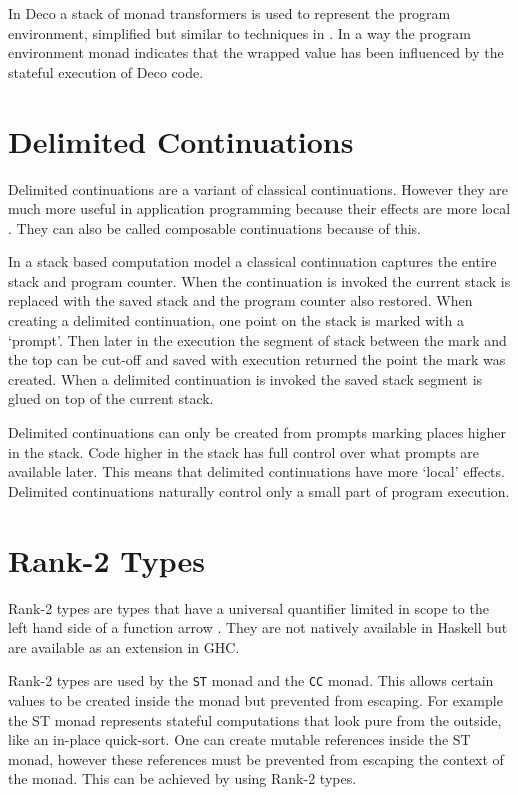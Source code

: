 \documentclass[]{article}
\newcommand{\type}[1]{\texttt{#1}}
\begin{document}
In Deco a stack of monad transformers is used to represent the program
environment, simplified but similar to techniques in \cite{Liang:Unknown1}. In
a way the program environment monad indicates that the wrapped value has been
influenced by the stateful execution of Deco code.

\section{Delimited Continuations}
\label{discussion:delcont}

Delimited continuations are a variant of classical continuations. However they
are much more useful in application programming because their effects are more
local \cite{Oleg:2011}. They can also be called composable continuations
because of this.

In a stack based computation model a classical continuation captures the
entire stack and program counter. When the continuation is invoked the current
stack is replaced with the saved stack and the program counter also restored.
When creating a delimited continuation, one point on the stack is marked with
a `prompt'. Then later in the execution the segment of stack between the mark
and the top can be cut-off and saved with execution returned the point the
mark was created. When a delimited continuation is invoked the saved
stack segment is glued on top of the current stack.

Delimited continuations can only be created from prompts marking places higher
in the stack. Code higher in the stack has full control over what prompts are
available later. This means that delimited continuations have more `local'
effects. Delimited continuations naturally control only a small part of
program execution.

\section{Rank-2 Types}
\label{discussion:rank2}

Rank-2 types are types that have a universal quantifier limited in scope to
the left hand side of a function arrow \cite{Wikibook:Haskell}. They are not
natively available in Haskell but are available as an extension in GHC.

Rank-2 types are used by the \type{ST} monad and the \type{CC} monad. This
allows certain values to be created inside the monad but prevented from
escaping. For example the ST monad represents stateful computations that look
pure from the outside, like an in-place quick-sort. One can create mutable
references inside the ST monad, however these references must be prevented
from escaping the context of the monad. This can be achieved by using Rank-2
types.
\end{document}
